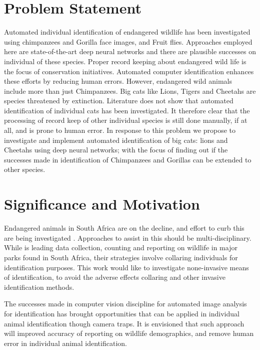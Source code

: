 \section{Problem Statement}
Automated individual identification of endangered wildlife has been investigated using chimpanzees and Gorilla face images, and Fruit flies. Approaches employed here are state-of-the-art deep neural networks and there are plausible successes on individual of these species. Proper record keeping about endangered wild life is the focus of conservation initiatives. Automated computer identification enhances these efforts by reducing human errors.      
However, endangered wild animals include more than just Chimpanzees. Big cats like Lions, Tigers and Cheetahs are species threatened by extinction. Literature does not show that automated identification of individual cats has been investigated. It therefore clear that the processing of record keep of other individual species is still done manually, if at all, and is prone to human error.        
In response to this problem we  propose to investigate and implement automated identification of big cats: lions and Cheetahs using deep neural networks; with the focus of finding out if the successes made in identification of Chimpanzees and Gorillas can be extended to other species. 

\section{Significance and Motivation}
Endangered  animals in South Africa are on the decline, and effort to curb this are being investigated \cite{marnewick2008evaluating}. Approaches to assist in this should be  multi-disciplinary. While \citeauthor{marnewick2018cheetaprob} \citeyear{marnewick2018cheetaprob} \cite{marnewick2018cheetaprob} is leading data collection, counting and reporting on wildlife in major parks found in South Africa, their strategies involve collaring individuals for identification purposes. 
This work would like to investigate none-invasive means of identification, to avoid the adverse effects collaring and other invasive identification methods. 

The successes made in computer vision discipline for automated image analysis for identification has brought opportunities that can be applied in individual animal identification though camera traps. It is envisioned that such approach will improved accuracy of reporting on wildlife demographics, and remove human error in individual animal identification. 

